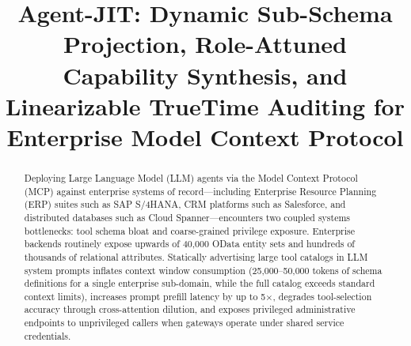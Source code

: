 \documentclass[conference,10pt]{IEEEtran}
\begin{document}
\title{Agent-JIT: Dynamic Sub-Schema Projection, Role-Attuned Capability Synthesis, and Linearizable TrueTime Auditing for Enterprise Model Context Protocol}

\author{
}

\maketitle

\begin{abstract}
Deploying Large Language Model (LLM) agents via the Model Context Protocol (MCP) against enterprise systems of record—including Enterprise Resource Planning (ERP) suites such as SAP S/4HANA, CRM platforms such as Salesforce, and distributed databases such as Cloud Spanner—encounters two coupled systems bottlenecks: tool schema bloat and coarse-grained privilege exposure. Enterprise backends routinely expose upwards of 40,000 OData entity sets and hundreds of thousands of relational attributes. Statically advertising large tool catalogs in LLM system prompts inflates context window consumption (25,000--50,000 tokens of schema definitions for a single enterprise sub-domain, while the full catalog exceeds standard context limits), increases prompt prefill latency by up to 5$\times$, degrades tool-selection accuracy through cross-attention dilution, and exposes privileged administrative endpoints to unprivileged callers when gateways operate under shared service credentials.


\end{abstract}
\end{document}
